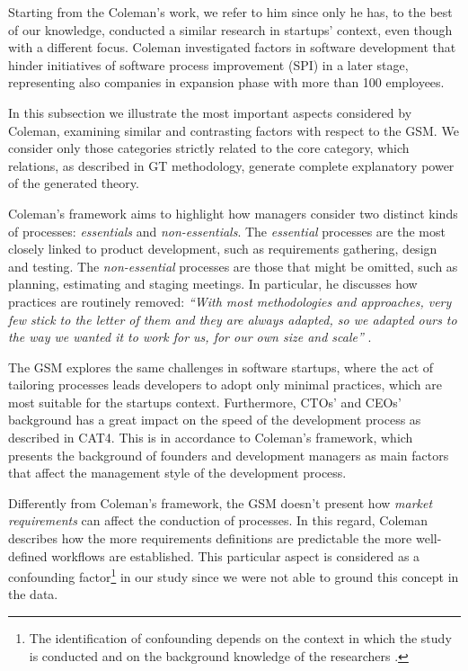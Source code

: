 \documentclass[10pt,journal,letterpaper,compsoc]{IEEEtran}
\begin{document}
Starting from the Coleman's work, we refer to him since only he has,  to the
best of our knowledge, conducted a similar research in startups' context, even
though with a different focus. Coleman investigated factors in software
development that hinder initiatives of software process improvement (SPI) in a
later stage, representing also companies in expansion phase with more than 100
employees. %

In this subsection we illustrate the most important aspects considered by
Coleman, examining similar and contrasting factors with respect to the GSM. We
consider only those categories strictly related to the core category, which
relations, as described in GT methodology, generate complete explanatory power
of the generated theory.

Coleman's framework aims to highlight how managers consider two distinct kinds
of processes: \textit{essentials} and \textit{non-essentials}. The
\textit{essential} processes are the most closely linked to product development,
such as requirements gathering, design and testing. The \textit{non-essential}
processes are those that might be omitted, such as planning, estimating and
staging meetings. In particular, he discusses how practices are routinely
removed: \textit{``With most methodologies and approaches, very few stick to the
letter of them and they are always adapted, so we adapted ours to the way we
wanted it to work for us, for our own size and scale''} \cite{Coleman2008}.

The GSM explores the same challenges in software startups, where the act of
tailoring processes leads developers to adopt only minimal practices, which are
most suitable for the startups context. Furthermore, CTOs' and CEOs' background
has a great impact on the speed of the development process as described in CAT4.
This is in accordance to Coleman's framework, which presents the background of
founders and development managers as main factors that affect the management
style of the development process.

Differently from Coleman's framework, the GSM doesn't present how
\textit{market requirements} can affect the conduction of processes. In this
regard, Coleman describes how the more requirements definitions are predictable
the more well-defined workflows are established. This particular aspect is
considered as a confounding factor\footnote{The identification of confounding
depends on the context in which the study is conducted and on the background
knowledge of the researchers \cite{Pearl2011}.}  in our study since we were not
able to ground this concept in the data.
\end{document}
